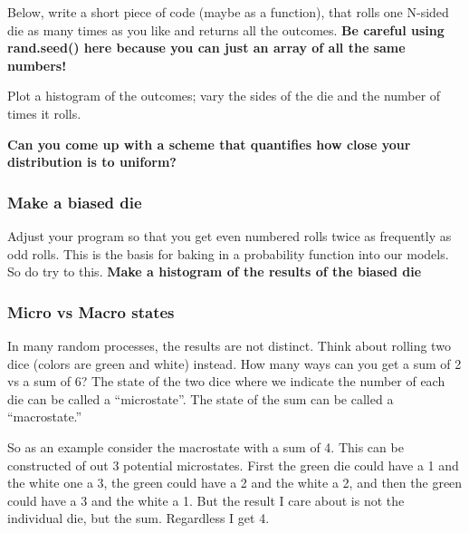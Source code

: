 Below, write a short piece of code (maybe as a function), that rolls one
N-sided die as many times as you like and returns all the outcomes.
\textbf{Be careful using rand.seed() here because you can just an array
of all the same numbers!}

Plot a histogram of the outcomes; vary the sides of the die and the
number of times it rolls.

\textbf{Can you come up with a scheme that quantifies how close your
distribution is to uniform?}

\begin{Shaded}
\begin{Highlighting}[]
\end{Highlighting}
\end{Shaded}

\subsubsection{Make a biased die}\label{make-a-biased-die}

Adjust your program so that you get even numbered rolls twice as
frequently as odd rolls. This is the basis for baking in a probability
function into our models. So do try to this. \textbf{Make a histogram of
the results of the biased die}

\begin{Shaded}
\begin{Highlighting}[]
\end{Highlighting}
\end{Shaded}

\subsubsection{Micro vs Macro states}\label{micro-vs-macro-states}

In many random processes, the results are not distinct. Think about
rolling two dice (colors are green and white) instead. How many ways can
you get a sum of 2 vs a sum of 6? The state of the two dice where we
indicate the number of each die can be called a ``microstate''. The
state of the sum can be called a ``macrostate.''

So as an example consider the macrostate with a sum of 4. This can be
constructed of out 3 potential microstates. First the green die could
have a 1 and the white one a 3, the green could have a 2 and the white a
2, and then the green could have a 3 and the white a 1. But the result I
care about is not the individual die, but the sum. Regardless I get 4.

